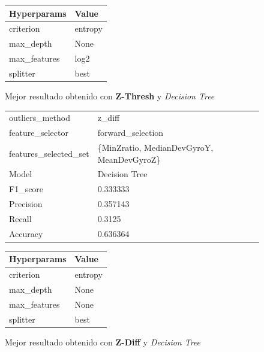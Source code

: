\begin{appendices}
\begin{figure}[htb]
			\begin{tabular}{ll}
			\toprule
			 Hyperparams &   Value \\
			\midrule
			   criterion & entropy \\
			   max\_depth &    None \\
			max\_features &    log2 \\
				splitter &    best \\
			\bottomrule
			\end{tabular}
			\caption{Mejor resultado obtenido con \textbf{Z-Thresh} y \emph{Decision Tree}}
			\label{table:21}
		\end{figure}

		\begin{figure}[htb]
			\centering
			\begin{tabular}{ll}
				\toprule
					  outliers\_method &                                    z\_diff \\
					 feature\_selector &                         forward\_selection \\
				features\_selected\_set & \{MinZratio, MedianDevGyroY, MeanDevGyroZ\} \\
								Model &                             Decision Tree \\
						F1\_score &                                  0.333333 \\
					   Precision &                                  0.357143 \\
						  Recall &                                    0.3125 \\
						Accuracy &                                  0.636364 \\
				\bottomrule
			\end{tabular}
			\newline
			\newline

			\begin{tabular}{ll}
				\toprule
				 Hyperparams &   Value \\
				\midrule
				   criterion & entropy \\
				   max\_depth &    None \\
				max\_features &    None \\
					splitter &    best \\
				\bottomrule
			\end{tabular}
			\caption{Mejor resultado obtenido con \textbf{Z-Diff} y \emph{Decision Tree}}
			\label{table:22}
		\end{figure}


\end{appendices}
